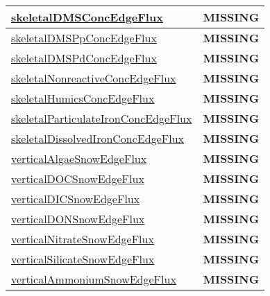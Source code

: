 {\begin{center}
\begin{longtable}{| p{2.0in} | p{4.0in} |}
    \hline
    \hyperref[subsec:var_sec_tracer_edge_fluxes_skeletalDMSConcEdgeFlux]{skeletalDMSConcEdgeFlux} & {\bf \color{red} MISSING} \\
    \hline
    \hyperref[subsec:var_sec_tracer_edge_fluxes_skeletalDMSPpConcEdgeFlux]{skeletalDMSPpConcEdgeFlux} & {\bf \color{red} MISSING} \\
    \hline
    \hyperref[subsec:var_sec_tracer_edge_fluxes_skeletalDMSPdConcEdgeFlux]{skeletalDMSPdConcEdgeFlux} & {\bf \color{red} MISSING} \\
    \hline
    \hyperref[subsec:var_sec_tracer_edge_fluxes_skeletalNonreactiveConcEdgeFlux]{skeletalNonreactiveConcEdgeFlux} & {\bf \color{red} MISSING} \\
    \hline
    \hyperref[subsec:var_sec_tracer_edge_fluxes_skeletalHumicsConcEdgeFlux]{skeletalHumicsConcEdgeFlux} & {\bf \color{red} MISSING} \\
    \hline
    \hyperref[subsec:var_sec_tracer_edge_fluxes_skeletalParticulateIronConcEdgeFlux]{skeletalParticulateIronConcEdge\-Flux} & {\bf \color{red} MISSING} \\
    \hline
    \hyperref[subsec:var_sec_tracer_edge_fluxes_skeletalDissolvedIronConcEdgeFlux]{skeletalDissolvedIronConcEdge\-Flux} & {\bf \color{red} MISSING} \\
    \hline
    \hyperref[subsec:var_sec_tracer_edge_fluxes_verticalAlgaeSnowEdgeFlux]{verticalAlgaeSnowEdgeFlux} & {\bf \color{red} MISSING} \\
    \hline
    \hyperref[subsec:var_sec_tracer_edge_fluxes_verticalDOCSnowEdgeFlux]{verticalDOCSnowEdgeFlux} & {\bf \color{red} MISSING} \\
    \hline
    \hyperref[subsec:var_sec_tracer_edge_fluxes_verticalDICSnowEdgeFlux]{verticalDICSnowEdgeFlux} & {\bf \color{red} MISSING} \\
    \hline
    \hyperref[subsec:var_sec_tracer_edge_fluxes_verticalDONSnowEdgeFlux]{verticalDONSnowEdgeFlux} & {\bf \color{red} MISSING} \\
    \hline
    \hyperref[subsec:var_sec_tracer_edge_fluxes_verticalNitrateSnowEdgeFlux]{verticalNitrateSnowEdgeFlux} & {\bf \color{red} MISSING} \\
    \hline
    \hyperref[subsec:var_sec_tracer_edge_fluxes_verticalSilicateSnowEdgeFlux]{verticalSilicateSnowEdgeFlux} & {\bf \color{red} MISSING} \\
    \hline
    \hyperref[subsec:var_sec_tracer_edge_fluxes_verticalAmmoniumSnowEdgeFlux]{verticalAmmoniumSnowEdge\-Flux} & {\bf \color{red} MISSING} \\

\end{longtable}
\end{center}}
